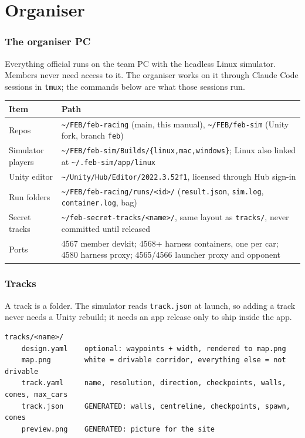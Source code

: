 \documentclass[11pt,a4paper]{article}
\newcommand{\file}[1]{\texttt{#1}}
\newcommand{\cmd}[1]{\texttt{#1}}
\begin{document}
\part{Organiser}

\section{The organiser PC}

Everything official runs on the team PC with the headless Linux simulator. Members never need
access to it. The organiser works on it through Claude Code sessions in \cmd{tmux}; the
commands below are what those sessions run.

\begin{tabularx}{\linewidth}{lX}
\toprule
Item & Path\\
\midrule
Repos & \file{\textasciitilde/FEB/feb-racing} (main, this manual), \file{\textasciitilde/FEB/feb-sim} (Unity fork, branch \texttt{feb})\\
Simulator players & \file{\textasciitilde/FEB/feb-sim/Builds/\{linux,mac,windows\}}; Linux also linked at \file{\textasciitilde/.feb-sim/app/linux}\\
Unity editor & \file{\textasciitilde/Unity/Hub/Editor/2022.3.52f1}, licensed through Hub sign-in\\
Run folders & \file{\textasciitilde/FEB/feb-racing/runs/<id>/} (\file{result.json}, \file{sim.log}, \file{container.log}, bag)\\
Secret tracks & \file{\textasciitilde/feb-secret-tracks/<name>/}, same layout as \file{tracks/}, never committed until released\\
Ports & 4567 member devkit; 4568+ harness containers, one per car; 4580 harness proxy; 4565/4566 launcher proxy and opponent\\
\bottomrule
\end{tabularx}

\section{Tracks}

A track is a folder. The simulator reads \file{track.json} at launch, so adding a track never
needs a Unity rebuild; it needs an app release only to ship inside the app.

\begin{lstlisting}
tracks/<name>/
    design.yaml    optional: waypoints + width, rendered to map.png
    map.png        white = drivable corridor, everything else = not drivable
    track.yaml     name, resolution, direction, checkpoints, walls, cones, max_cars
    track.json     GENERATED: walls, centreline, checkpoints, spawn, cones
    preview.png    GENERATED: picture for the site
\end{lstlisting}
\end{document}
